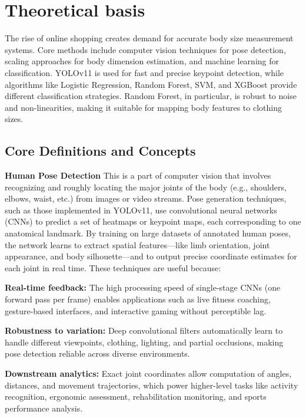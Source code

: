 \documentclass{llncs}
\begin{document}
\section{Theoretical basis}

The rise of online shopping creates demand for accurate body size measurement systems. 
Core methods include computer vision techniques for pose detection, scaling approaches for body dimension estimation, and machine learning for classification. 
YOLOv11 is used for fast and precise keypoint detection, while algorithms like Logistic Regression, Random Forest, SVM, and XGBoost provide different classification strategies. 
Random Forest, in particular, is robust to noise and non-linearities, making it suitable for mapping body features to clothing sizes.


\subsection{Core Definitions and Concepts}

\textbf{Human Pose Detection} This is a part of computer vision that involves recognizing and roughly locating the major joints of the body (e.g., shoulders, elbows, waist, etc.) from images or video streams. 
Pose generation techniques, such as those implemented in YOLOv11, use convolutional neural networks (CNNs) to predict a set of heatmaps or keypoint maps, each corresponding to one anatomical landmark. 
By training on large datasets of annotated human poses, the network learns to extract spatial features---like limb orientation, joint appearance, 
    and body silhouette---and to output precise coordinate estimates for each joint in real time. These techniques are useful because:

\medskip

\textbf{Real-time feedback:} The high processing speed of single-stage CNNs (one forward pass per frame) enables applications such as live fitness coaching, gesture-based interfaces, and interactive gaming without perceptible lag.

\medskip

\textbf{Robustness to variation:} Deep convolutional filters automatically learn to handle different viewpoints, clothing, lighting, and partial occlusions, making pose detection reliable across diverse environments.

\medskip

\textbf{Downstream analytics:} Exact joint coordinates allow computation of angles, distances, and movement trajectories, which power higher-level tasks like activity recognition, ergonomic assessment, rehabilitation monitoring, and sports performance analysis.
\end{document}
